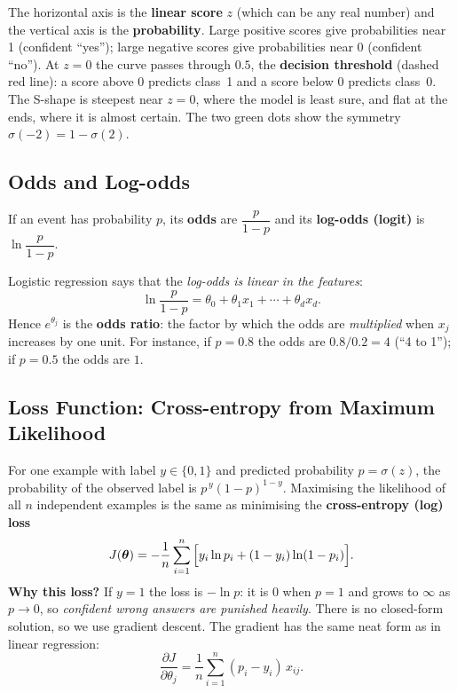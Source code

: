 \begin{explain}
The horizontal axis is the \textbf{linear score} $z$ (which can be any real number) and the vertical axis is the \textbf{probability}. Large positive scores give probabilities near 1 (confident ``yes''); large negative scores give probabilities near 0 (confident ``no''). At $z=0$ the curve passes through $0.5$, the \textbf{decision threshold} (dashed red line): a score above 0 predicts class~1 and a score below 0 predicts class~0. The S-shape is steepest near $z=0$, where the model is least sure, and flat at the ends, where it is almost certain. The two green dots show the symmetry $\sigma(-2)=1-\sigma(2)$.
\end{explain}

\subsection{Odds and Log-odds}

\begin{definition}
If an event has probability $p$, its \textbf{odds} are $\dfrac{p}{1-p}$ and its \textbf{log-odds (logit)} is $\ln\dfrac{p}{1-p}$.
\end{definition}

Logistic regression says that the \emph{log-odds is linear in the features}:
\[
  \ln\frac{p}{1-p}=\theta_0+\theta_1x_1+\cdots+\theta_dx_d .
\]
Hence $e^{\theta_j}$ is the \textbf{odds ratio}: the factor by which the odds are \emph{multiplied} when $x_j$ increases by one unit. For instance, if $p=0.8$ the odds are $0.8/0.2=4$ (``4 to 1''); if $p=0.5$ the odds are $1$.

\subsection{Loss Function: Cross-entropy from Maximum Likelihood}

For one example with label $y\in\{0,1\}$ and predicted probability $p=\sigma(z)$, the probability of the observed label is $p^{\,y}(1-p)^{1-y}$. Maximising the likelihood of all $n$ independent examples is the same as minimising the \textbf{cross-entropy (log) loss}
\begin{equation}\label{eq:logloss}
  J(\boldsymbol{\theta})=-\frac1n\sum_{i=1}^{n}\Big[y_i\ln p_i+(1-y_i)\ln(1-p_i)\Big].
\end{equation}
\textbf{Why this loss?} If $y=1$ the loss is $-\ln p$: it is $0$ when $p=1$ and grows to $\infty$ as $p\to0$, so \emph{confident wrong answers are punished heavily}. There is no closed-form solution, so we use gradient descent. The gradient has the same neat form as in linear regression:
\[
  \frac{\partial J}{\partial\theta_j}=\frac1n\sum_{i=1}^{n}(p_i-y_i)\,x_{ij}.
\]

